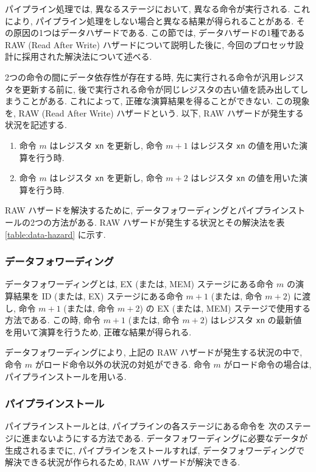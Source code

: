 \documentclass[../specifications.tex]{subfiles}
\begin{document}
  パイプライン処理では, 異なるステージにおいて, 異なる命令が実行される.
  これにより, パイプライン処理をしない場合と異なる結果が得られることがある.
  その原因の1つはデータハザードである.
  この節では, データハザードの1種である RAW (Read After Write) ハザードについて説明した後に, 
  今回のプロセッサ設計に採用された解決法について述べる.

  2つの命令の間にデータ依存性が存在する時, 
  先に実行される命令が汎用レジスタを更新する前に, 
  後で実行される命令が同じレジスタの古い値を読み出してしまうことがある.
  これによって, 正確な演算結果を得ることができない.
  この現象を, RAW (Read After Write) ハザードという.
  以下, RAW ハザードが発生する状況を記述する.

  \begin{enumerate}
    \item 命令 $m$ はレジスタ \verb|xn| を更新し, 
    命令 $m+1$ はレジスタ \verb|xn| の値を用いた演算を行う時.

    \item 命令 $m$ はレジスタ \verb|xn| を更新し, 
    命令 $m+2$ はレジスタ \verb|xn| の値を用いた演算を行う時.
  \end{enumerate}

  RAW ハザードを解決するために, データフォワーディングとパイプラインストールの2つの方法がある.
  RAW ハザードが発生する状況とその解決法を表 \ref{table:data-hazard} に示す.

  \subsubsection{データフォワーディング}
  データフォワーディングとは, EX (または, MEM) ステージにある命令 $m$ の演算結果を
  ID (または, EX) ステージにある命令 $m+1$ (または, 命令 $m+2$) に渡し, 
  命令 $m+1$ (または, 命令 $m+2$) の EX (または, MEM) ステージで使用する方法である.
  この時, 命令 $m+1$ (または, 命令 $m+2$) はレジスタ \verb|xn| の最新値
  を用いて演算を行うため, 正確な結果が得られる.

  データフォワーディングにより, 上記の RAW ハザードが発生する状況の中で, 
  命令 $m$ がロード命令以外の状況の対処ができる.
  命令 $m$ がロード命令の場合は, パイプラインストールを用いる.

  \subsubsection{パイプラインストール}
  パイプラインストールとは, パイプラインの各ステージにある命令を
  次のステージに進まないようにする方法である.
  データフォワーディングに必要なデータが生成されるまでに, 
  パイプラインをストールすれば, データフォワーディングで解決できる状況が作られるため, 
  RAW ハザードが解決できる.
\end{document}
